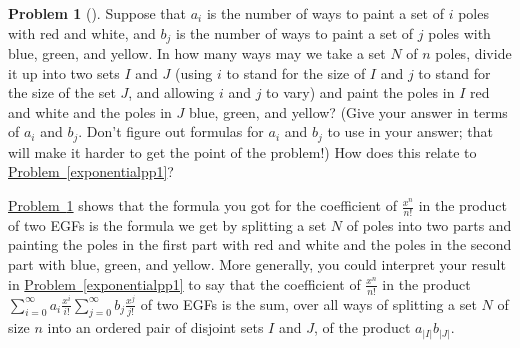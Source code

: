 \documentclass[10pt,]{book}
\theoremstyle{plain}
\theoremstyle{definition}
\newtheorem{activity}[project]{Problem}
\theoremstyle{definition}
\numberwithin{equation}{chapter}
\begin{document}
\begin{activity}[] \label{exponentialpp2}
Suppose that \(a_i\) is the number of ways to paint a set of \(i\) poles with red and white, and \(b_j\) is the number of ways to paint a set of \(j\) poles with blue, green, and yellow. In how many ways may we take a set \(N\) of \(n\) poles, divide it up into two sets \(I\) and \(J\) (using \(i\) to stand for the size of \(I\) and \(j\) to stand for the size of the set \(J\), and allowing \(i\) and \(j\) to vary) and paint the poles in \(I\) red and white and the poles in \(J\) blue, green, and yellow? (Give your answer in terms of \(a_i\) and \(b_j\).  Don't figure out formulas for  \(a_i\) and \(b_j\) to use in your answer; that will make it harder to get the point of the problem!) How does this relate to \hyperref[exponentialpp1]{Problem~\ref{exponentialpp1}}?%
\end{activity}
\hyperref[exponentialpp2]{Problem~\ref{exponentialpp2}} shows that the formula you got for the coefficient of \(\frac{x^n}{n!}\) in the product of two EGFs is the formula we get by splitting a set \(N\) of poles into two parts and painting the poles in the first part with red and white and the poles in the second part with blue, green, and yellow.  More generally, you could interpret your result in \hyperref[exponentialpp1]{Problem~\ref{exponentialpp1}} to say that the coefficient of \(\frac{x^n}{n!}\) in the product \(\sum_{i=0}^\infty a_i \frac{x^i}{i!}
\sum_{j=0}^\infty b_j\frac{x^j}{j!}\) of two EGFs is the sum, over all ways of splitting a set \(N\) of size \(n\) into an ordered pair of disjoint sets \(I\) and \(J\), of the product \(a_{|I|}b_{|J|}\).%
\par
\end{document}
